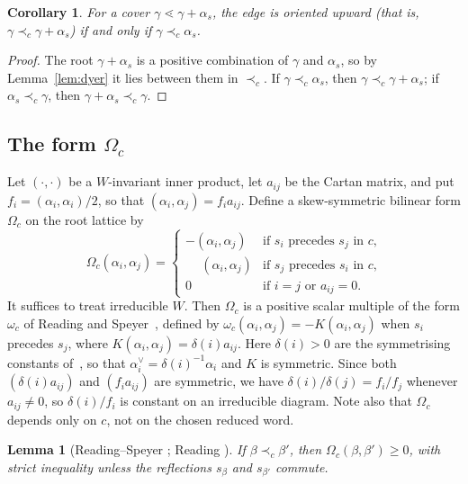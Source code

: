 \documentclass[11pt]{amsart}
\newtheorem{lemma}[theorem]{Lemma}
\newtheorem{corollary}[theorem]{Corollary}
\theoremstyle{definition}
\newcommand{\pr}{\prec_c}
\begin{document}
\begin{corollary}\label{cor:up}
For a cover $\gamma\lessdot\gamma+\alpha_s$, the edge is oriented upward (that is, $\gamma\pr\gamma+\alpha_s$) if and only if $\gamma\pr\alpha_s$.
\end{corollary}

\begin{proof}
The root $\gamma+\alpha_s$ is a positive combination of $\gamma$ and $\alpha_s$, so by Lemma~\ref{lem:dyer} it lies between them in $\pr$. If $\gamma\pr\alpha_s$, then $\gamma\pr\gamma+\alpha_s$; if $\alpha_s\pr\gamma$, then $\gamma+\alpha_s\pr\gamma$.
\end{proof}

\subsection{\texorpdfstring{The form $\Omega_c$}{The form Omega\_c}}
Let $(\cdot,\cdot)$ be a $W$-invariant inner product, let $a_{ij}$ be the Cartan matrix, and put $f_i=(\alpha_i,\alpha_i)/2$, so that $(\alpha_i,\alpha_j)=f_ia_{ij}$. Define a skew-symmetric bilinear form $\Omega_c$ on the root lattice by
\[\Omega_c(\alpha_i,\alpha_j)=\begin{cases}-(\alpha_i,\alpha_j)&\text{if $s_i$ precedes $s_j$ in $c$,}\\ \phantom{-}(\alpha_i,\alpha_j)&\text{if $s_j$ precedes $s_i$ in $c$,}\\ 0&\text{if $i=j$ or $a_{ij}=0$.}\end{cases}\]
It suffices to treat irreducible $W$. Then $\Omega_c$ is a positive scalar multiple of the form $\omega_c$ of Reading and Speyer~\cite{RS}, defined by $\omega_c(\alpha_i,\alpha_j)=-K(\alpha_i,\alpha_j)$ when $s_i$ precedes $s_j$, where $K(\alpha_i,\alpha_j)=\delta(i)a_{ij}$. Here $\delta(i)>0$ are the symmetrising constants of~\cite[\S2.2]{RS}, so that $\alpha_i^\vee=\delta(i)^{-1}\alpha_i$ and $K$ is symmetric. Since both $(\delta(i)a_{ij})$ and $(f_ia_{ij})$ are symmetric, we have $\delta(i)/\delta(j)=f_i/f_j$ whenever $a_{ij}\ne0$, so $\delta(i)/f_i$ is constant on an irreducible diagram. Note also that $\Omega_c$ depends only on $c$, not on the chosen reduced word.

\begin{lemma}[Reading--Speyer {\cite[Prop.~3.11]{RS}}; Reading {\cite[Cor.~4.4]{Rea}}]\label{lem:RS}
If $\beta\pr\beta'$, then $\Omega_c(\beta,\beta')\ge0$, with strict inequality unless the reflections $s_\beta$ and $s_{\beta'}$ commute.
\end{lemma}
\end{document}

